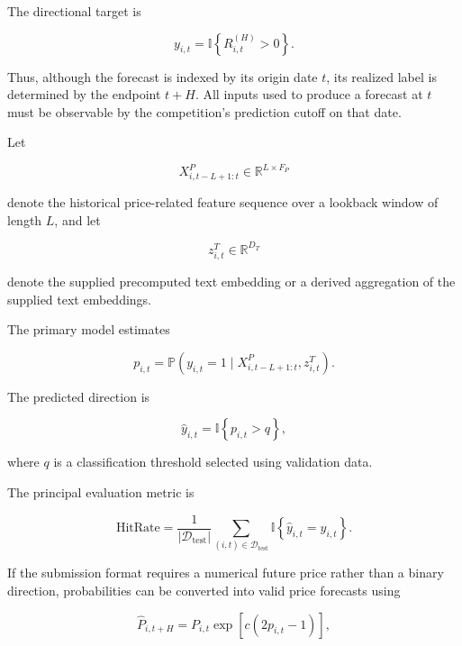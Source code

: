 \documentclass[11pt]{article}
\newcommand{\R}{\mathbb{R}}
\newcommand{\Prob}{\mathbb{P}}
\newcommand{\ind}{\mathbb{I}}
\begin{document}
The directional target is

\begin{equation}
y_{i,t}
=
\ind\left\{
R_{i,t}^{(H)} > 0
\right\}.
\end{equation}

Thus, although the forecast is indexed by its origin date $t$, its realized
label is determined by the endpoint $t+H$. All inputs used to produce a
forecast at $t$ must be observable by the competition's prediction cutoff on
that date.

Let

\begin{equation}
X^{P}_{i,t-L+1:t}
\in
\R^{L \times F_P}
\end{equation}

denote the historical price-related feature sequence over a lookback window
of length $L$, and let

\begin{equation}
z^T_{i,t}
\in
\R^{D_T}
\end{equation}

denote the supplied precomputed text embedding or a derived aggregation of
the supplied text embeddings.

The primary model estimates

\begin{equation}
p_{i,t}
=
\Prob
\left(
y_{i,t}=1
\mid
X^P_{i,t-L+1:t},
z^T_{i,t}
\right).
\end{equation}

The predicted direction is

\begin{equation}
\widehat{y}_{i,t}
=
\ind\left\{
p_{i,t} > q
\right\},
\end{equation}

where $q$ is a classification threshold selected using validation data.

The principal evaluation metric is

\begin{equation}
\mathrm{HitRate}
=
\frac{1}{|\mathcal{D}_{\mathrm{test}}|}
\sum_{(i,t)\in\mathcal{D}_{\mathrm{test}}}
\ind
\left\{
\widehat{y}_{i,t}=y_{i,t}
\right\}.
\end{equation}

If the submission format requires a numerical future price rather than a
binary direction, probabilities can be converted into valid price forecasts
using

\begin{equation}
\widehat{P}_{i,t+H}
=
P_{i,t}
\exp
\left[
c(2p_{i,t}-1)
\right],
\end{equation}
\end{document}
